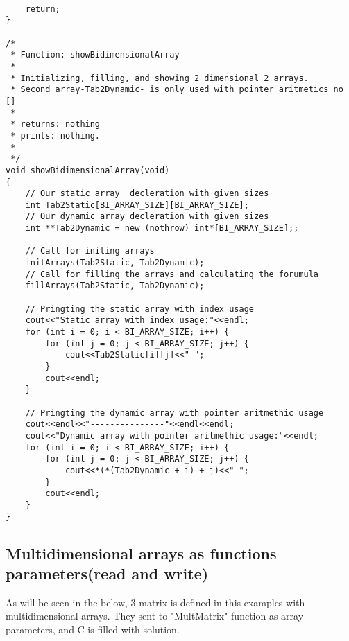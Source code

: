 \documentclass{article}
\begin{document}
\begin{lstlisting}[label=bidimensional-array,caption=Bidimensional Pascal Array]
    
    return;
}

/*
 * Function: showBidimensionalArray
 * -----------------------------
 * Initializing, filling, and showing 2 dimensional 2 arrays.
 * Second array-Tab2Dynamic- is only used with pointer aritmetics no []
 *
 * returns: nothing
 * prints: nothing.
 *
 */
void showBidimensionalArray(void)
{
    // Our static array  decleration with given sizes
    int Tab2Static[BI_ARRAY_SIZE][BI_ARRAY_SIZE];
    // Our dynamic array decleration with given sizes
    int **Tab2Dynamic = new (nothrow) int*[BI_ARRAY_SIZE];;
    
    // Call for initing arrays
    initArrays(Tab2Static, Tab2Dynamic);
    // Call for filling the arrays and calculating the forumula
    fillArrays(Tab2Static, Tab2Dynamic);
    
    // Pringting the static array with index usage
    cout<<"Static array with index usage:"<<endl;
    for (int i = 0; i < BI_ARRAY_SIZE; i++) {
        for (int j = 0; j < BI_ARRAY_SIZE; j++) {
            cout<<Tab2Static[i][j]<<" ";
        }
        cout<<endl;
    }
    
    // Pringting the dynamic array with pointer aritmethic usage
    cout<<endl<<"---------------"<<endl<<endl;
    cout<<"Dynamic array with pointer aritmethic usage:"<<endl;
    for (int i = 0; i < BI_ARRAY_SIZE; i++) {
        for (int j = 0; j < BI_ARRAY_SIZE; j++) {
            cout<<*(*(Tab2Dynamic + i) + j)<<" ";
        }
        cout<<endl;
    }
}

		\end{lstlisting}
		
		
		
	\subsection{Multidimensional arrays as functions parameters(read and write)}		
	As will be seen in the below, 3 matrix is defined in this examples with multidimensional arrays. They sent to "MultMatrix" function as array parameters, and C is filled with solution.
	
\end{document}
